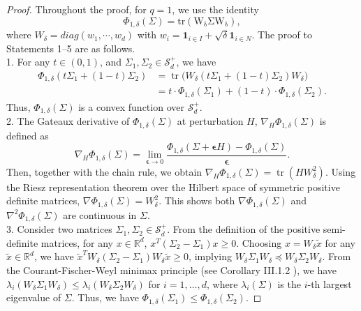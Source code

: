 \documentclass[12pt]{article}
\newcommand{\bfepsilon}{\boldsymbol{\epsilon}}
\begin{document}
\begin{proof}
Throughout the proof, for $q=1$, we use the identity 
\begin{equation*}
\Phi_{1,\delta}(\Sigma) = \operatorname{tr( W_{\delta} \Sigma W_{\delta})},
\end{equation*}
where $W_{\delta} = diag(w_1,\cdots,w_d)$ with $w_i = \mathbf{1}_{i \in I} + \sqrt{\delta} \mathbf{1}_{i \in N}$. The proof to Statements 1--5 are as follows.
\\ 1. For any $t \in (0,1)$, and $\Sigma_1, \Sigma_2 \in \mathcal{S}_d^+$, we have
\begin{align*}
\Phi_{1,\delta}(t \Sigma_1 + (1-t) \Sigma_2) &= \operatorname{tr}\Big( W_{\delta} ( t \Sigma_1 + (1-t) \Sigma_2) W_{\delta} \Big)
\\ & = t \cdot \Phi_{1,\delta}( \Sigma_1 ) + (1 - t) \cdot \Phi_{1,\delta} (\Sigma_2).
\end{align*}
Thus, $\Phi_{1,\delta}(\Sigma)$ is a convex function over $\mathcal{S}_d^+$. 
\\ 2. The Gateaux derivative of $\Phi_{1,\delta}(\Sigma)$ at perturbation $H$, $\nabla_H \Phi_{1,\delta}(\Sigma)$ is defined as 
\begin{equation*}
\nabla_H \Phi_{1,\delta}(\Sigma) = \lim_{\bfepsilon \to 0} \frac{\Phi_{1,\delta}(\Sigma + \bfepsilon H) - \Phi_{1,\delta}(\Sigma)}{\bfepsilon}.
\end{equation*}
Then, together with the chain rule, we obtain $\nabla_{H} \Phi_{1,\delta}(\Sigma) = \operatorname{tr}( H W_{\delta}^2)$. Using the Riesz representation theorem over the Hilbert space of symmetric positive definite matrices, $\nabla \Phi_{1,\delta}(\Sigma) = W_{\delta}^2$. This shows both $\nabla \Phi_{1,\delta}(\Sigma)$ and $\nabla^2 \Phi_{1, \delta}(\Sigma)$ are continuous in $\Sigma$.
\\ 3. Consider two matrices $\Sigma_1, \Sigma_2 \in \mathcal{S}_d^+$. From the definition of the positive semi-definite matrices, for any $x \in \mathbb{R}^d$, $x^T(\Sigma_2 - \Sigma_1)x \geq 0$. Choosing $x = W_{\delta} \tilde{x}$ for any $\tilde{x} \in \mathbb{R}^d$, we have $\tilde{x}^T W_{\delta} (\Sigma_2 - \Sigma_1) W_{\delta} \tilde{x} \geq 0$, implying $W_{\delta} \Sigma_1 W_{\delta} \preceq W_{\delta} \Sigma_2 W_{\delta}$. From the Courant-Fischer-Weyl minimax principle (see Corollary III.1.2 ), we have $\lambda_{i}( W_{\delta} \Sigma_1 W_{\delta}) \leq \lambda_i( W_{\delta} \Sigma_2 W_{\delta})$ for $i = 1, \ldots, d$, where $\lambda_i(\Sigma)$ is the $i$-th largest eigenvalue of $\Sigma$. Thus, we have $\Phi_{1,\delta}(\Sigma_1) \leq \Phi_{1,\delta}(\Sigma_2)$.

\end{proof}
\end{document}
